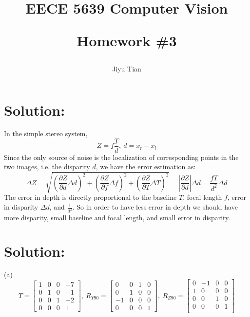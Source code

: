 \documentclass[12pt]{article}
\title{EECE 5639 Computer Vision\\ [2ex] \begin{large} Homework \#3 \end{large} }
\author{Jiyu Tian}
\date{}
\begin{document}
\maketitle
\pagestyle{empty}
\section{Solution:}
In the simple stereo system,
\begin{equation*}
    Z = f\frac{T}{d},\ d= x_r - x_l
\end{equation*}
Since the only source of noise is the localization of corresponding points in the two images, i.e. the disparity $d$, we have the error estimation as:
\begin{equation*}
    \Delta Z = \sqrt{\left( \frac{\partial Z}{\partial d}\Delta d\right)^2+ \left( \frac{\partial Z}{\partial f}\Delta f\right)^2 + \left( \frac{\partial Z}{\partial T}\Delta T\right)^2} = |\frac{\partial Z}{\partial d}|\Delta d = \frac{fT}{d^2}\Delta d
\end{equation*}
The error in depth is directly proportional to the baseline $T$, focal length $f$, error in disparity $\Delta d$, and $\frac{1}{d^2}$. So in order to have less error in depth we should have more disparity, small baseline and focal length, and small error in disparity.

\section{Solution:}
(a) 
\begin{equation*}
T = \left[ \begin{array}{cccc}
1 & 0 & 0 & -7\\
0 & 1 & 0 & -1\\
0 & 0 & 1 & -2\\
0 & 0 & 0 & 1
\end{array} \right],\ R_{Y90}  = \left[ \begin{array}{cccc}
0 & 0 & 1 & 0\\
0 & 1 & 0 & 0\\
-1 & 0 & 0 & 0\\
0 & 0 & 0 & 1
\end{array} \right],\ R_{Z90}  = \left[ \begin{array}{cccc}
0 & -1 & 0 & 0\\
1 & 0 & 0 & 0\\
0 & 0 & 1 & 0\\
0 & 0 & 0 & 1\\
\end{array} \right]
\end{equation*}
\end{document}
